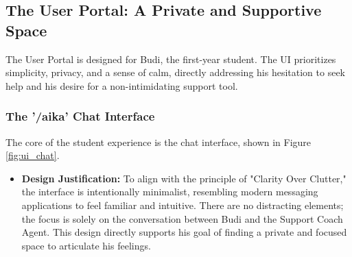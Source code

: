 \subsection{The User Portal: A Private and Supportive Space}

The User Portal is designed for Budi, the first-year student. The UI prioritizes simplicity, privacy, and a sense of calm, directly addressing his hesitation to seek help and his desire for a non-intimidating support tool.

\subsubsection{The '/aika' Chat Interface}
The core of the student experience is the chat interface, shown in Figure \ref{fig:ui_chat}.
\begin{itemize}
    \item \textbf{Design Justification:} To align with the principle of "Clarity Over Clutter," the interface is intentionally minimalist, resembling modern messaging applications to feel familiar and intuitive. There are no distracting elements; the focus is solely on the conversation between Budi and the Support Coach Agent. This design directly supports his goal of finding a private and focused space to articulate his feelings.
\end{itemize}


